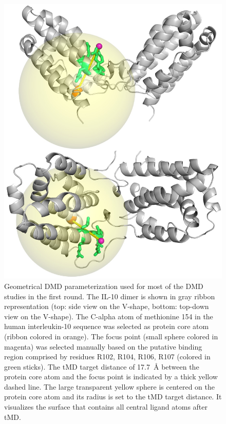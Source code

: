 \begin{figure}
\centering
\includegraphics[width=1.0\textwidth]{gfx/dmdil10/round1_il10_ligandcenter_proteincore_sphere_top_and_side_001.jpg}
\caption[]{Geometrical DMD parameterization used for most of the DMD studies
in the first round. The IL-10 dimer is shown in gray ribbon representation (top:
side view on the V-shape, bottom: top-down view on the V-shape). The C-alpha
atom of methionine 154 in the human interleukin-10 sequence was selected as
protein core atom (ribbon colored in orange). The focus point (small sphere
colored in magenta) was selected manually based on the putative binding region
comprised by residues R102, R104, R106, R107 (colored in green sticks). The tMD
target distance of \SI{17.7}{\angstrom} between the protein core atom and the
focus point is indicated by a thick yellow dashed line. The large transparent
yellow sphere is centered on the protein core atom and its radius is set to the
tMD target distance. It visualizes the surface that contains all central ligand
atoms after tMD.}
\label{fig:dmdil10:dmd_geometry_round1}
\end{figure}

